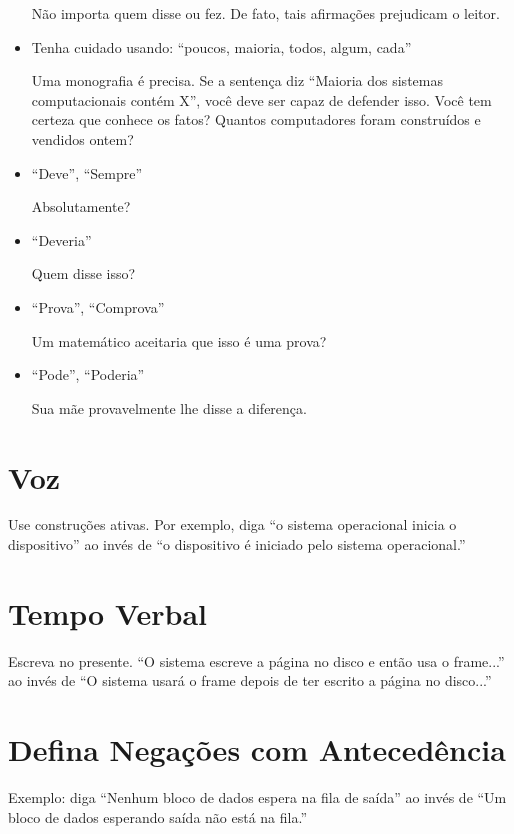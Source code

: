 \begin{itemize}
		\indent Não importa quem disse ou fez. De fato, tais afirmações prejudicam o leitor.
		
	\item Tenha cuidado usando: ``poucos, maioria, todos, algum, cada'' 

		\indent Uma monografia é precisa. Se a sentença diz ``Maioria dos sistemas computacionais contém X'', você deve ser capaz de defender isso. Você tem certeza que conhece os fatos? Quantos computadores foram construídos e vendidos ontem?
		
	\item ``Deve'', ``Sempre''

		\indent Absolutamente?
		
	\item ``Deveria''

		\indent Quem disse isso?
		
	\item ``Prova'', ``Comprova''

		\indent Um matemático aceitaria que isso é uma prova?

	\item ``Pode'', ``Poderia''

		\indent Sua mãe provavelmente lhe disse a diferença.

\end{itemize}

\section{Voz}

Use construções ativas. Por exemplo, diga ``o sistema operacional inicia o dispositivo'' ao invés de ``o dispositivo é iniciado pelo sistema operacional.''

\section{Tempo Verbal}

Escreva no presente. ``O sistema escreve a página no disco e então usa o frame...'' ao invés de ``O sistema usará o frame depois de ter escrito a página no disco...''

\section{Defina Negações com Antecedência}

Exemplo: diga ``Nenhum bloco de dados espera na fila de saída'' ao invés de ``Um bloco de dados esperando saída não está na fila.''

